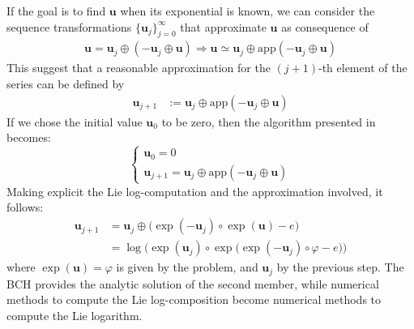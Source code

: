 If the goal is to find $\mathbf{u}$ when its exponential is known, we can consider the sequence transformations $\{\mathbf{u}_{j}  \}_{j=0}^{\infty}$ that approximate $\mathbf{u}$ as consequence of
\begin{align*}
\mathbf{u} = \mathbf{u}_{j} \oplus  (-\mathbf{u}_{j}  \oplus  \mathbf{u} ) \Longrightarrow
\mathbf{u} \simeq \mathbf{u}_{j} \oplus  \text{app}(-\mathbf{u}_{j}  \oplus  \mathbf{u} )
\end{align*}
This suggest that a reasonable approximation for the $(j+1)$-th element of the series can be defined by
\begin{align*}
\mathbf{u}_{j+1} & :=  \mathbf{u}_{j} \oplus  \text{app}(-\mathbf{u}_{j}  \oplus  \mathbf{u} )
\end{align*}
If we chose the initial value $\mathbf{u}_{0}$ to be zero, then the algorithm presented in \cite{Bossa:08}  becomes:
\begin{equation}\label{eq:bossa_reformulated}
\begin{cases}
\mathbf{u}_0 = 0 \\
\mathbf{u}_{j+1} = \mathbf{u}_{j} \oplus  \text{app}(-\mathbf{u}_{j}  \oplus  \mathbf{u} )
\end{cases}
\end{equation}
Making explicit the Lie log-computation and the approximation involved, it follows:
\begin{align}
\mathbf{u}_{j+1} 
&=
\mathbf{u}_{j} \oplus \big( \exp(-\mathbf{u}_{j})  \circ   \exp(\mathbf{u}) - e \big)\\
&=
 \log\Big( \exp( \mathbf{u}_{j}) \circ \exp \big( \exp(-\mathbf{u}_{j})  \circ  \varphi - e \big) \Big)
\end{align}
where $\exp(\mathbf{u}) = \varphi$ is given by the problem, and $\mathbf{u}_{j}$ by the previous step. The BCH provides the analytic solution of the second member, while 
numerical methods to compute the Lie log-composition become numerical methods to compute the Lie logarithm.

